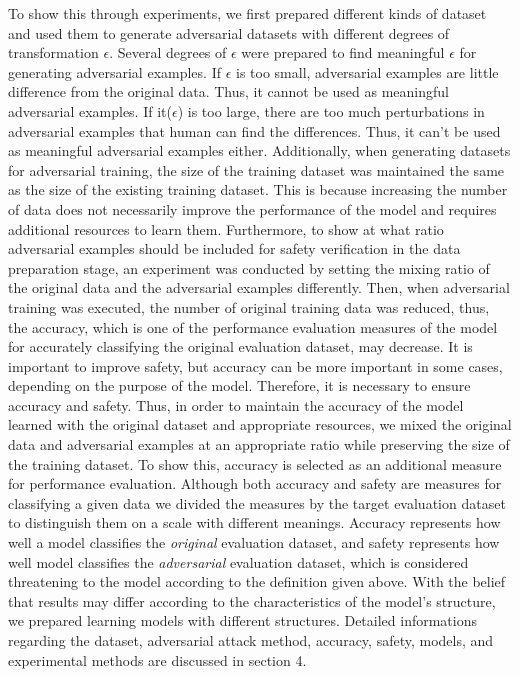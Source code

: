 \documentclass[journal,article,submit,moreauthors,pdftex]{Definitions/mdpi}
\begin{document}
To show this through experiments, we first prepared different kinds of dataset and used them to generate adversarial datasets with different degrees of transformation \begin{math}\epsilon\end{math}.
Several degrees of \begin{math}\epsilon\end{math} were prepared to find meaningful \begin{math}\epsilon\end{math} for generating adversarial examples.
If \begin{math}\epsilon\end{math} is too small, adversarial examples are little difference from the original data. Thus, it cannot be used as meaningful adversarial examples.
If it(\begin{math}\epsilon\end{math}) is too large, there are too much perturbations in adversarial examples that human can find the differences. Thus, it can't be used as meaningful adversarial examples either.
Additionally, when generating datasets for adversarial training, the size of the training dataset was maintained the same as the size of the existing training dataset.
This is because increasing the number of data does not necessarily improve the performance of the model and requires additional resources to learn them.
Furthermore, to show at what ratio adversarial examples should be included for safety verification in the data preparation stage, an experiment was conducted by setting the mixing ratio of the original data and the adversarial examples differently.
Then, when adversarial training was executed, the number of original training data was reduced, thus, the accuracy, which is one of the performance evaluation measures of the model for accurately classifying the original evaluation dataset, may decrease\cite{trade-off}. 
It is important to improve safety, but accuracy can be more important in some cases, depending on the purpose of the model.
Therefore, it is necessary to ensure accuracy and safety. 
Thus, in order to maintain the accuracy of the model learned with the original dataset and appropriate resources, we mixed the original data and adversarial examples at an appropriate ratio while preserving the size of the training dataset.
To show this, accuracy is selected as an additional measure for performance evaluation.
Although both accuracy and safety are measures for classifying a given data we divided the measures by the target evaluation dataset to distinguish them on a scale with different meanings.
Accuracy represents how well a model classifies the {\it original} evaluation dataset, and safety represents how well model classifies the {\it adversarial} evaluation dataset, which is considered threatening to the model according to the definition given above.
With the belief that results may differ according to the characteristics of the model's structure, we prepared learning models with different structures. 
Detailed informations regarding the dataset, adversarial attack method, accuracy, safety, models, and experimental methods are discussed in section 4.
\end{document}
